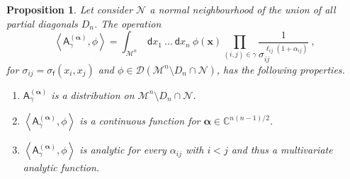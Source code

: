 \documentclass[11pt]{book}
\newcommand{\alphabd}{\boldsymbol{\alpha}}
\newcommand{\sm}[1]{\left\langle#1\right\rangle}
\newcommand{\Dcal}{\mathcal{D}}
\newcommand{\Mcal}{\mathcal{M}}
\newcommand{\Ncal}{\mathcal{N}}
\newcommand{\Cbb}{\mathbb{C}}
\newcommand{\Asf}{\mathsf{A}}
\newcommand{\dsf}{\mathsf{d}}
\newcommand{\fsf}{\mathsf{f}}
\theoremstyle{break}
\newtheorem{proposition}{Proposition}
\begin{document}
\begin{proposition}\label{prop:amplitude_sigma_prop_analyt}
Let consider $\Ncal$ a normal neighbourhood of the union of all partial diagonals $D_n$. The operation
%
\begin{equation*}
\sm{ \Asf_\gamma^{(\alphabd)} , \phi } = \int_{\Mcal^n} \ \dsf x_1 \ \dots \ \dsf x_n \ \phi(\mathbf{x}) \prod_{(i,j)\in\gamma} \frac{1}{\sigma_{ij}^{\ell_{ij}(1+ \alpha_{ij})}}  \ , 
\end{equation*}
%
for $\sigma_{ij}=\sigma_\fsf(x_i,x_j)$ and $\phi\in \Dcal(\Mcal^n\setminus D_n\cap \Ncal)$, has the following properties.
%
\begin{enumerate}
%
\item $\Asf_\gamma^{(\alphabd)}$ is a distribution on $\Mcal^n\setminus D_n\cap \Ncal$.
%
\item $\sm{ \Asf_\gamma^{(\alphabd)} , \phi }$ is a continuous function for $\alphabd \in \Cbb^{n(n-1)/2}$.
%
\item $\sm{ \Asf_\gamma^{(\alphabd)} , \phi }$ is analytic for every $\alpha_{ij}$ with $i<j$ and thus a multivariate analytic function.
%
\end{enumerate}
%
\end{proposition}
\end{document}
